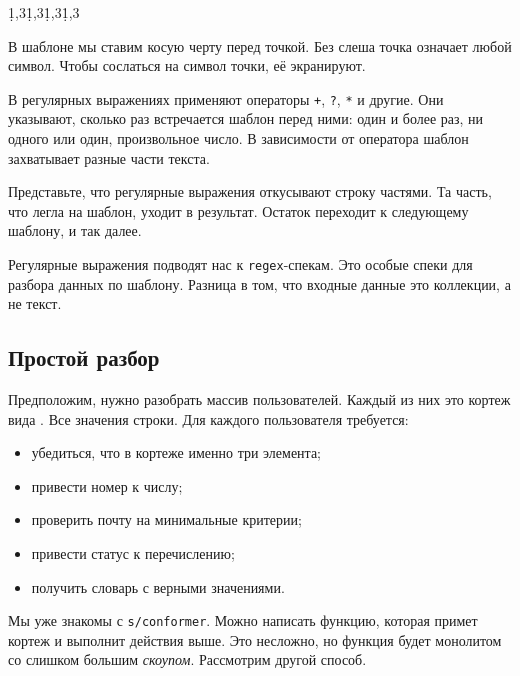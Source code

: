 
\begin{english}
  \begin{text}
\d{1,3}\.\d{1,3}\.\d{1,3}\.\d{1,3}
  \end{text}
\end{english}

В шаблоне мы ставим косую черту перед точкой. Без слеша точка означает любой
символ. Чтобы сослаться на символ точки, её экранируют.

В регулярных выражениях применяют операторы \verb|+|, \verb|?|, \verb|*| и
другие. Они указывают, сколько раз встречается шаблон перед ними: один и более
раз, ни одного или один, произвольное число. В зависимости от оператора шаблон
захватывает разные части текста.

Представьте, что регулярные выражения откусывают строку частями. Та часть, что
легла на шаблон, уходит в результат. Остаток переходит к следующему шаблону, и
так далее.

Регулярные выражения подводят нас к \verb|regex|-спекам. Это особые спеки для
разбора данных по шаблону. Разница в том, что входные данные это коллекции, а не
текст.


\subsection{Простой разбор}

Предположим, нужно разобрать массив пользователей. Каждый из них это кортеж вида
. Все значения строки. Для каждого пользователя
требуется:

\begin{itemize}

\item
  убедиться, что в кортеже именно три элемента;

\item
  привести номер к числу;

\item
  проверить почту на минимальные критерии;

\item
  привести статус к перечислению;

\item
  получить словарь с верными значениями.

\end{itemize}

Мы уже знакомы с \verb|s/conformer|. Можно написать функцию, которая примет
кортеж и выполнит действия выше. Это несложно, но функция будет монолитом со
слишком большим \emph{скоупом}. Рассмотрим другой способ.

